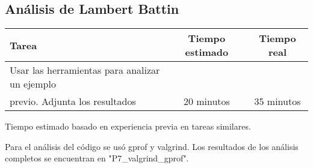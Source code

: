 \documentclass[12pt,a4paper]{article}
\begin{document}
\subsection{Análisis de Lambert Battin}
    \begin{center}
        \begin{tabular}{|l|c|c|}
            \hline
            \textbf{Tarea} & \textbf{Tiempo estimado} & \textbf{Tiempo real} \\
            \hline
            Usar las herramientas para analizar un ejemplo
\\previo. Adjunta los resultados & 20 minutos & 35 minutos \\
            \hline
        \end{tabular}
    \end{center}
    \begin{center}
        Tiempo estimado basado en experiencia previa en tareas similares.
    \end{center}
Para el análisis del código se usó gprof y valgrind. Los resultados de los análisis completos se encuentran en "P7\_valgrind\_gprof\/".


\end{document}
